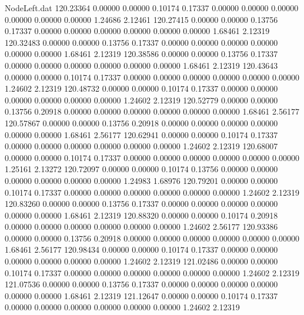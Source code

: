 \begin{filecontents}{NodeLeft.dat}
 120.23364    0.00000    0.00000     0.10174    0.17337    0.00000    0.00000    0.00000    0.00000    0.00000    0.00000    1.24686    2.12461
 120.27415    0.00000    0.00000     0.13756    0.17337    0.00000    0.00000    0.00000    0.00000    0.00000    0.00000    1.68461    2.12319
 120.32483    0.00000    0.00000     0.13756    0.17337    0.00000    0.00000    0.00000    0.00000    0.00000    0.00000    1.68461    2.12319
 120.38586    0.00000    0.00000     0.13756    0.17337    0.00000    0.00000    0.00000    0.00000    0.00000    0.00000    1.68461    2.12319
 120.43643    0.00000    0.00000     0.10174    0.17337    0.00000    0.00000    0.00000    0.00000    0.00000    0.00000    1.24602    2.12319
 120.48732    0.00000    0.00000     0.10174    0.17337    0.00000    0.00000    0.00000    0.00000    0.00000    0.00000    1.24602    2.12319
 120.52779    0.00000    0.00000     0.13756    0.20918    0.00000    0.00000    0.00000    0.00000    0.00000    0.00000    1.68461    2.56177
 120.57867    0.00000    0.00000     0.13756    0.20918    0.00000    0.00000    0.00000    0.00000    0.00000    0.00000    1.68461    2.56177
 120.62941    0.00000    0.00000     0.10174    0.17337    0.00000    0.00000    0.00000    0.00000    0.00000    0.00000    1.24602    2.12319
 120.68007    0.00000    0.00000     0.10174    0.17337    0.00000    0.00000    0.00000    0.00000    0.00000    0.00000    1.25161    2.13272
 120.72097    0.00000    0.00000     0.10174    0.13756    0.00000    0.00000    0.00000    0.00000    0.00000    0.00000    1.24983    1.68976
 120.79201    0.00000    0.00000     0.10174    0.17337    0.00000    0.00000    0.00000    0.00000    0.00000    0.00000    1.24602    2.12319
 120.83260    0.00000    0.00000     0.13756    0.17337    0.00000    0.00000    0.00000    0.00000    0.00000    0.00000    1.68461    2.12319
 120.88320    0.00000    0.00000     0.10174    0.20918    0.00000    0.00000    0.00000    0.00000    0.00000    0.00000    1.24602    2.56177
 120.93386    0.00000    0.00000     0.13756    0.20918    0.00000    0.00000    0.00000    0.00000    0.00000    0.00000    1.68461    2.56177
 120.98434    0.00000    0.00000     0.10174    0.17337    0.00000    0.00000    0.00000    0.00000    0.00000    0.00000    1.24602    2.12319
 121.02486    0.00000    0.00000     0.10174    0.17337    0.00000    0.00000    0.00000    0.00000    0.00000    0.00000    1.24602    2.12319
 121.07536    0.00000    0.00000     0.13756    0.17337    0.00000    0.00000    0.00000    0.00000    0.00000    0.00000    1.68461    2.12319
 121.12647    0.00000    0.00000     0.10174    0.17337    0.00000    0.00000    0.00000    0.00000    0.00000    0.00000    1.24602    2.12319

\end{filecontents}
